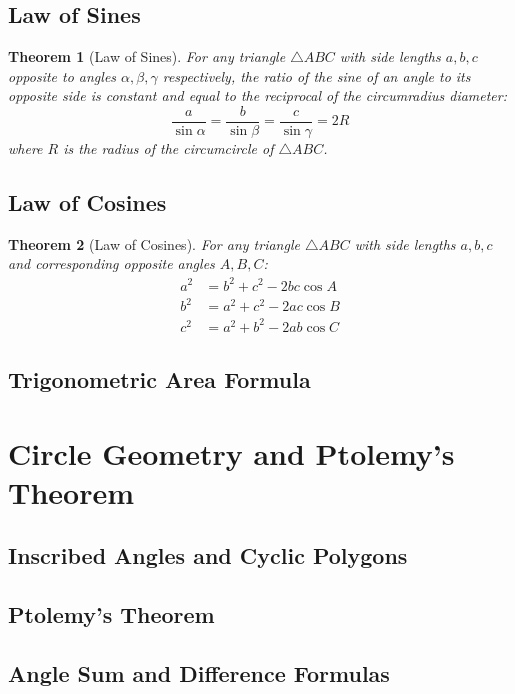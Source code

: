 \documentclass{article}
\theoremstyle{definition}
\theoremstyle{plain}
\newtheorem{theorem}{Theorem}[]
\begin{document}
\subsection{Law of Sines}

\begin{theorem}[Law of Sines]
    For any triangle $\triangle ABC$ with side lengths $a, b, c$ opposite to angles $\alpha, \beta, \gamma$ respectively, the ratio of the sine of an angle to its opposite side is constant and equal to the reciprocal of the circumradius diameter:
    \[
    \frac{a}{\sin \alpha} = \frac{b}{\sin \beta} = \frac{c}{\sin \gamma} = 2R
    \]
    where $R$ is the radius of the circumcircle of $\triangle ABC$.
\end{theorem}

\subsection{Law of Cosines}

\begin{theorem}[Law of Cosines]
    For any triangle $\triangle ABC$ with side lengths $a, b, c$ and corresponding opposite angles $A, B, C$:
    \begin{align*}
        a^2 &= b^2 + c^2 - 2bc \cos A \\
        b^2 &= a^2 + c^2 - 2ac \cos B \\
        c^2 &= a^2 + b^2 - 2ab \cos C
    \end{align*}
\end{theorem}

\subsection{Trigonometric Area Formula}

\section{Circle Geometry and Ptolemy's Theorem}

\subsection{Inscribed Angles and Cyclic Polygons}

\subsection{Ptolemy's Theorem}

\subsection{Angle Sum and Difference Formulas}
\end{document}
